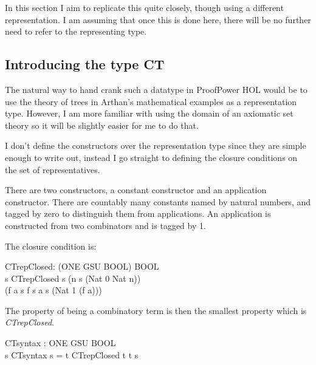 In this section I aim to replicate this quite closely, though using a different representation.
I am assuming that once this is done here, there will be no further need to refer to the representing type.

\subsection{Introducing the type CT}

The natural way to hand crank such a datatype in ProofPower HOL would be to use the theory of trees in Arthan's mathematical examples as a representation type.
However, I am more familiar with using the domain of an axiomatic set theory so it will be slightly easier for me to do that.

I don't define the constructors over the representation type since they are simple enough to write out, instead I go straight to defining the closure conditions on the set of representatives.

There are two constructors, a constant constructor and an application constructor.
There are countably many constants named by natural numbers, and tagged by zero to distinguish them from applications.
An application is constructed from two combinators and is tagged by 1.

The closure condition is:

\begin{HOLConst}
\+\PrNM{} \PrNL{}CTrepClosed\PrNN{}: (ONE GSU \MMM{\rightarrow} BOOL) \MMM{\rightarrow} BOOL\\
\PrPH{}\PrPM{}\PrPM{}\PrPM{}\PrPM{}\PrPM{}\PrPM{}\PrPM{}\PrPM{}\PrPM{}\PrPM{}\PrPM{}
\+\PrNM{} \MMM{\forall} s\MMM{\bullet} CTrepClosed s \MMM{\Leftrightarrow} (\MMM{\forall}n\MMM{\bullet} s (Nat 0 \MMM{\mapsto} Nat n))\\
\+\PrNM{}	\MMM{\land} (\MMM{\forall}f a\MMM{\bullet} s f \MMM{\land} s a \MMM{\Rightarrow} s (Nat 1 \MMM{\mapsto} (f \MMM{\mapsto} a)))\\
\end{HOLConst}

The property of being a combinatory term is then the smallest property which is \emph{CTrepClosed}.

\begin{HOLConst}
\+\PrNM{} \PrNL{}CTsyntax\PrNN{} : ONE GSU \MMM{\rightarrow} BOOL\\
\PrPH{}\PrPM{}\PrPM{}\PrPM{}\PrPM{}\PrPM{}\PrPM{}\PrPM{}\PrPM{}\PrPM{}\PrPM{}\PrPM{}
\+\PrNM{} \MMM{\forall}s\MMM{\bullet} CTsyntax s = \MMM{\forall}t \MMM{\bullet} CTrepClosed t \MMM{\Rightarrow} t s\\
\end{HOLConst}

